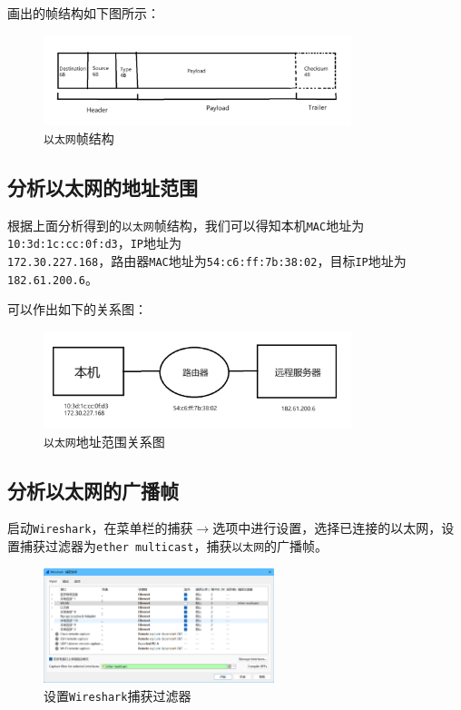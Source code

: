 \documentclass{article}
\begin{document}
画出的帧结构如下图所示：

\begin{figure}[H]
  \centering
  \includegraphics[width=0.8\textwidth]{images/09.png}
  \caption{\texttt{以太网}帧结构}
\end{figure}

\subsection{分析以太网的地址范围}

根据上面分析得到的\texttt{以太网}帧结构，我们可以得知本机\texttt{MAC}地址为\texttt{10:3d:1c:cc:0f:d3}，\texttt{IP}地址为\\\texttt{172.30.227.168}，路由器\texttt{MAC}地址为\texttt{54:c6:ff:7b:38:02}，目标\texttt{IP}地址为\texttt{182.61.200.6}。

可以作出如下的关系图：

\begin{figure}[H]
  \centering
  \includegraphics[width=0.8\textwidth]{images/10.png}
  \caption{\texttt{以太网}地址范围关系图}
\end{figure}

\subsection{分析以太网的广播帧}

启动\texttt{Wireshark}，在菜单栏的捕获\(\to \)选项中进行设置，选择已连接的以太网，设置捕获过滤器为\texttt{ether multicast}，捕获\texttt{以太网}的广播帧。

\begin{figure}[H]
  \centering
  \includegraphics[width=0.6\textwidth]{images/11.png}
  \caption{设置\texttt{Wireshark}捕获过滤器}
\end{figure}
\end{document}
